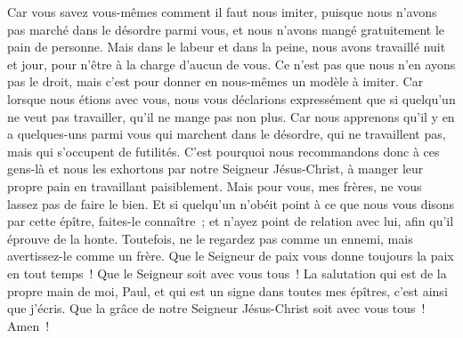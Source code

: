 \begin{multicols}{2}
Car vous savez vous-mêmes comment il faut nous imiter, puisque nous n'avons pas marché dans le désordre parmi vous,
et nous n'avons mangé gratuitement le pain de personne. Mais dans le labeur et dans la peine, nous avons travaillé nuit et jour, pour n'être à la charge d'aucun de vous.
Ce n'est pas que nous n'en ayons pas le droit, mais c'est pour donner en nous-mêmes un modèle à imiter.
Car lorsque nous étions avec vous, nous vous déclarions expressément que si quelqu'un ne veut pas travailler, qu'il ne mange pas non plus.
Car nous apprenons qu'il y en a quelques-uns parmi vous qui marchent dans le désordre, qui ne travaillent pas, mais qui s'occupent de futilités.
C'est pourquoi nous recommandons donc à ces gens-là et nous les exhortons par notre Seigneur Jésus-Christ, à manger leur propre pain en travaillant paisiblement.
Mais pour vous, mes frères, ne vous lassez pas de faire le bien.
Et si quelqu'un n'obéit point à ce que nous vous disons par cette épître, faites-le connaître~; et n'ayez point de relation avec lui, afin qu'il éprouve de la honte.
Toutefois, ne le regardez pas comme un ennemi, mais avertissez-le comme un frère.
Que le Seigneur de paix vous donne toujours la paix en tout temps~! Que le Seigneur soit avec vous tous~!
La salutation qui est de la propre main de moi, Paul, et qui est un signe dans toutes mes épîtres, c'est ainsi que j'écris.
Que la grâce de notre Seigneur Jésus-Christ soit avec vous tous~! Amen~!
\PPE{}
\end{multicols}
